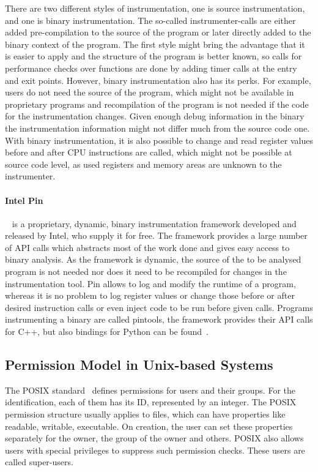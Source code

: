 There are two different styles of instrumentation, one is source
instrumentation, and one is binary instrumentation. The so-called
instrumenter-calls are either added pre-compilation to the source of the program
or later directly added to the binary context of the program. The first style
might bring the advantage that it is easier to apply and the structure of the
program is better known, so calls for performance checks over functions are done
by adding timer calls at the entry and exit points. However, binary
instrumentation also has its perks. For example, users do not need the source of
the program, which might not be available in proprietary programs and
recompilation of the program is not needed if the code for the instrumentation
changes. Given enough debug information in the binary the instrumentation
information might not differ much from the source code one. With binary
instrumentation, it is also possible to change and read register values before
and after CPU instructions are called, which might not be possible at source
code level, as used registers and memory areas are unknown to the instrumenter.

\paragraph{Intel Pin}~\cite{pintool} is a proprietary, dynamic, binary
instrumentation framework developed and released by Intel, who supply it for
free. The framework provides a large number of API calls which abstracts most of
the work done and gives easy access to binary analysis. As the framework is
dynamic, the source of the to be analysed program is not needed nor does it need
to be recompiled for changes in the instrumentation tool. Pin allows to log and
modify the runtime of a program, whereas it is no problem to log register values
or change those before or after desired instruction calls or even inject code to
be run before given calls. Programs instrumenting a binary are called pintools,
the framework provides their API calls for C++, but also bindings for Python can
be found~.

\subsection{Permission Model in Unix-based Systems}

The POSIX standard~\cite{posix} defines permissions for users and their groups.
For the identification, each of them has its ID, represented by an integer. The
POSIX permission structure usually applies to files, which can have properties
like readable, writable, executable. On creation, the user can set these
properties separately for the owner, the group of the owner and others. POSIX
also allows users with special privileges to suppress such permission checks.
These users are called super-users.

